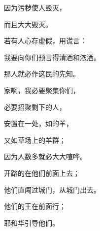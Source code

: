 {\par }{\Q 因为污秽使人毁灭，
\par }{\Q 而且大大毁灭。
\par }{\Q {}若有人心存虚假，用谎言{}：
\par }{\Q 我要向你们预言得清酒和浓酒。
\par }{\Q 那人就必作这民的先知。
\par }{\BB \par }{\Q {}家啊，我必要聚集你们，
\par }{\Q 必要招聚{}剩下的人，
\par }{\Q 安置在一处，如{}的羊，
\par }{\Q 又如草场上的羊群；
\par }{\Q 因为人数{}多就必大大喧哗。
\par }{\Q {}开路的在他们前面上去；
\par }{\Q 他们直闯过城门，从城门出去。
\par }{\Q 他们的王在前面行；
\par }{\Q 耶和华引导他们。
\par }{\BB \par }
